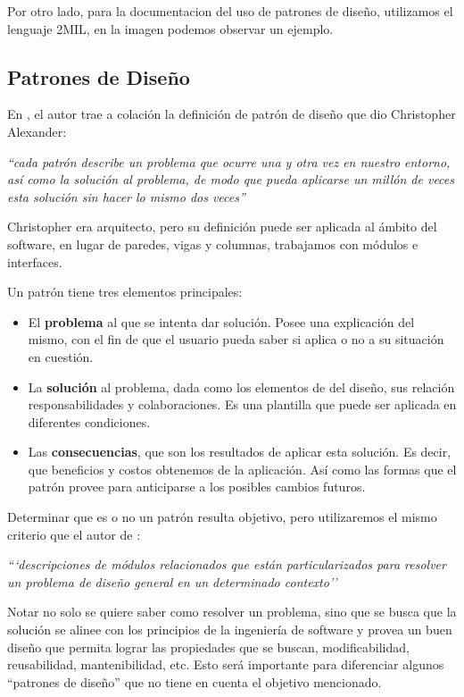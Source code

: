 Por otro lado, para la documentacion del uso de patrones de diseño, utilizamos el lenguaje 2MIL, en la imagen  podemos observar un ejemplo.



\subsection{Patrones de Diseño}

En \cite{Gamma:1995:DPE:186897}, el autor trae a colación la definición de patrón de diseño que dio Christopher Alexander:

\textit{``cada patrón describe un problema que ocurre una y otra vez en nuestro entorno, así como la solución al problema, de modo que pueda aplicarse un millón de veces esta solución sin hacer lo mismo dos veces''}

Christopher era arquitecto, pero su definición puede ser aplicada al ámbito del software, en lugar de paredes, vigas y columnas, trabajamos con módulos e interfaces.

Un patrón tiene tres elementos principales:

\begin{itemize}
	\item El \textbf{problema} al que se intenta dar solución. Posee una explicación del mismo, con el fin de que el usuario pueda saber si aplica o no a su situación en cuestión.
	\item La \textbf{solución} al problema, dada como los elementos de del diseño, sus relación responsabilidades y colaboraciones. Es una plantilla que puede ser aplicada en diferentes condiciones.
	\item Las \textbf{consecuencias}, que son los resultados de aplicar esta solución. Es decir, que beneficios y costos obtenemos de la aplicación. Así como las formas que el patrón provee para anticiparse a los posibles cambios futuros.
\end{itemize}

Determinar que es o no un patrón resulta objetivo, pero utilizaremos el mismo criterio que el autor de \cite{Gamma:1995:DPE:186897}:

\textit{```descripciones de módulos relacionados que están particularizados para resolver un problema de diseño general en un determinado contexto''}

Notar no solo se quiere saber como resolver un problema, sino que se busca que la solución se alinee con los principios de la ingeniería de software y provea un buen diseño que permita lograr las propiedades que se buscan, modificabilidad, reusabilidad, mantenibilidad, etc. Esto será importante para diferenciar algunos ``patrones de diseño'' que no tiene en cuenta el objetivo mencionado.

